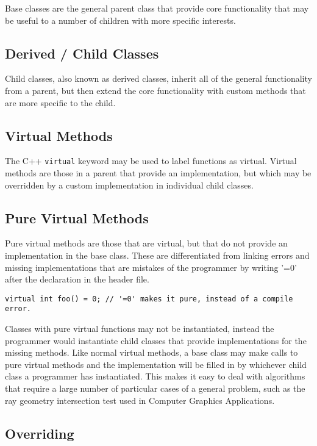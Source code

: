 \documentclass[12pt, letterpaper]{article}
\begin{document}
Base classes are the general parent class that provide core functionality that may be useful to a number of children with more specific interests.

\subsection{Derived / Child Classes}

Child classes, also known as derived classes, inherit all of the general functionality from a parent, but then extend the core functionality with custom methods that are more specific to the child.

\subsection{Virtual Methods}

The C++ \texttt{virtual} keyword may be used to label functions as virtual. Virtual methods are those in a parent that provide an implementation, but which may be overridden by a custom implementation in individual child classes.

\subsection{Pure Virtual Methods}

Pure virtual methods are those that are virtual, but that do not provide an implementation in the base class. These are differentiated from linking errors and missing implementations that are mistakes of the programmer by writing '=0' after the declaration in the header file.

\begin{verbatim}
virtual int foo() = 0; // '=0' makes it pure, instead of a compile error.
\end{verbatim}

Classes with pure virtual functions may not be instantiated, instead the programmer would instantiate child classes that provide implementations for the missing methods. Like normal virtual methods, a base class may make calls to pure virtual methods and the implementation will be filled in by whichever child class a programmer has instantiated. This makes it easy to deal with algorithms that require a large number of particular cases of a general problem, such as the ray geometry intersection test used in Computer Graphics Applications.

\subsection{Overriding}
\end{document}
